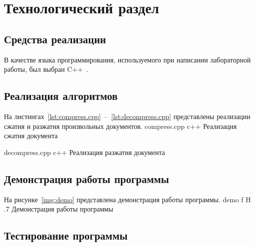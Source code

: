 \chapter{Технологический раздел}

\section{Средства реализации}

В качестве языка программирования, используемого при написании лабораторной работы, был выбран C++~\cite{cpp-lang}.
	
\section{Реализация алгоритмов}

На листингах~\ref{lst:compress.cpp}~--~\ref{lst:decompress.cpp} представлены реализации сжатия и разжатия произвольных документов.
	{compress.cpp}
	{c++}
	{Реализация сжатия документа}

	{decompress.cpp}
	{c++}
	{Реализация разжатия документа}

\section{Демонстрация работы программы}

На рисунке~\ref{img:demo} представлена демонстрация работы программы.
	{demo}
	{f}
	{H}
	{.7\textwidth}
	{Демонстрация работы программы}

\section{Тестирование программы}

